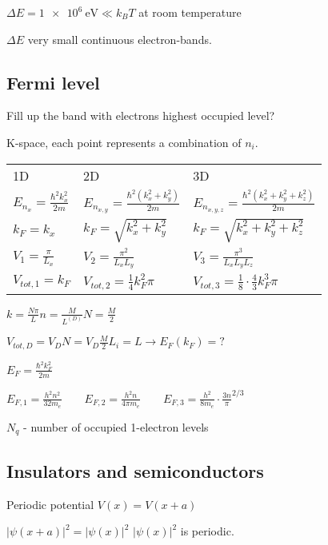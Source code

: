 \documentclass[10pt,a4paper]{scrartcl}
\begin{document}
\begin{multicols*}{3}
	$\Delta E = \SI{1e6}{\electronvolt}\ll k_BT$ at room temperature
	
	$\Delta E$ very small \dahe continuous electron-\glqq bands\grqq.
	
	\subsection{Fermi level}
	
	Fill up the band with electrons \dahe highest occupied level?
	
	K-space, each point represents a combination of $n_i$.
	
	\begin{tabular}{l|l|l}
	1D&2D&3D\\
	$E_{n_x}=\frac{\hbar^2k_x^2}{2m}$&$E_{n_{x,y}}=\frac{\hbar^2(k_x^2+k_y^2)}{2m}$&$E_{n_{x,y,z}}=\frac{\hbar^2(k_x^2+k_y^2+k_z^2)}{2m}$\\
	$k_F=k_x$&$k_F=\sqrt{k_x^2+k_y^2}$&$k_F=\sqrt{k_x^2+k_y^2+k_z^2}$\\
	$V_1=\frac{\pi}{L_x}$&$V_2=\frac{\pi^2}{L_xL_y}$&$V_3=\frac{\pi^3}{L_xL_yL_z}$\\
	$V_{tot,1}=k_F$&$V_{tot,2}=\frac{1}{4}k_F^2\pi$&$V_{tot,3}=\frac{1}{8}\cdot\frac{4}{3}k_F^3\pi$\\
	\end{tabular}
		
	$k=\frac{N\pi}{L}$\hfill$ n=\frac{M}{L^{(D)}}$\hfill$N=\frac{M}{2}$
	
	$V_{tot,D}=V_DN=V_D\frac{M}{2}$\hfill$L_i=L$\hfill$\rightarrow E_F(k_F)=?$
	
	$E_F=\frac{\hbar^2 k_F^2}{2m}$
	
	$E_{F,1}=\frac{h^2 n^2}{32m_e}\qquad E_{F,2}=\frac{h^2n}{4\pi m_e} \qquad E_{F,3}=\frac{h^2}{8m_e}\cdot\frac{3n}{\pi}^{2/3}$
	
	$N_q$ - number of occupied 1-electron levels
	
	
	\subsection{Insulators and semiconductors}
	
	Periodic potential $V(x)=V(x+a)$
	
	$|\psi(x+a)|^2=|\psi(x)|^2$ \dahe $|\psi(x)|^2$ is periodic.
	

\end{multicols*}
\end{document}
